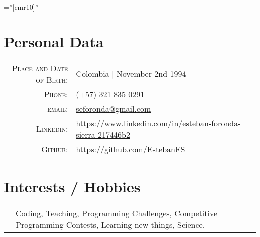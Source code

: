 \documentclass[a4paper,10pt]{article} %
\begin{document}
\pagestyle{empty} %

\font\fb=''[cmr10]'' %


\par{\bigskip\par} %

\section{Personal Data}

\begin{tabular}{rl}
\textsc{Place and Date of Birth:} & Colombia | November 2nd 1994\\
\textsc{Phone:} & (+57) 321 835 0291\\
\textsc{email:} & \href{mailto:seforonda@gmail.com}{seforonda@gmail.com}\\
\textsc{Linkedin:} & \href{https://www.linkedin.com/in/esteban-foronda-sierra-217446b2}{https://www.linkedin.com/in/esteban-foronda-sierra-217446b2}\\
\textsc{Github:} & \href{https://github.com/EstebanFS}{https://github.com/EstebanFS}\\
\end{tabular}



\section{Interests / Hobbies}
\begin{tabular}{r|p{11cm}}
& \footnotesize{Coding, Teaching, Programming Challenges, Competitive Programming Contests, Learning new things, Science.}
\end{tabular}

\iffalse
\end{document}
